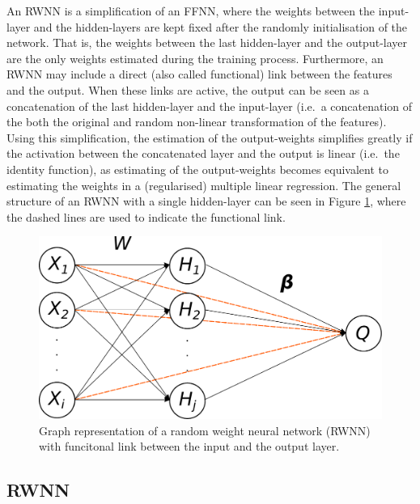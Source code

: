 \documentclass[
]{jss}
\begin{document}
An RWNN is a simplification of an FFNN, where the weights between the
input-layer and the hidden-layers are kept fixed after the randomly
initialisation of the network. That is, the weights between the last
hidden-layer and the output-layer are the only weights estimated during
the training process. Furthermore, an RWNN may include a direct (also
called functional) link between the features and the output. When these
links are active, the output can be seen as a concatenation of the last
hidden-layer and the input-layer (i.e.~a concatenation of the both the
original and random non-linear transformation of the features). Using
this simplification, the estimation of the output-weights simplifies
greatly if the activation between the concatenated layer and the output
is linear (i.e.~the identity function), as estimating of the
output-weights becomes equivalent to estimating the weights in a
(regularised) multiple linear regression. The general structure of an
RWNN with a single hidden-layer can be seen in Figure \ref{fig:rwnn},
where the dashed lines are used to indicate the functional link.

\begin{CodeChunk}
\begin{figure}

{\centering \includegraphics[width=0.6\linewidth]{./Figures/RWNN} 

}

\caption[Graph representation of a random weight neural network (RWNN) with funcitonal link between the input and the output layer]{Graph representation of a random weight neural network (RWNN) with funcitonal link between the input and the output layer.}\label{fig:rwnn}
\end{figure}
\end{CodeChunk}

\hypertarget{rwnn}{%
\subsection{RWNN}\label{rwnn}}
\end{document}

